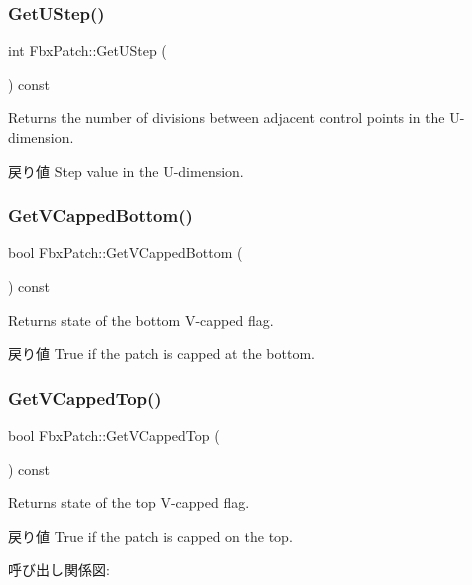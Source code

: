 \subsubsection{\texorpdfstring{Get\+U\+Step()}{GetUStep()}}
{\footnotesize\ttfamily int Fbx\+Patch\+::\+Get\+U\+Step (\begin{DoxyParamCaption}{ }\end{DoxyParamCaption}) const}

Returns the number of divisions between adjacent control points in the U-\/dimension. \begin{DoxyReturn}{戻り値}
Step value in the U-\/dimension. 
\end{DoxyReturn}
\mbox{\label{class_fbx_patch_a57ded499bc9f25f46dd2b3acd44a23f7}} 
\subsubsection{\texorpdfstring{Get\+V\+Capped\+Bottom()}{GetVCappedBottom()}}
{\footnotesize\ttfamily bool Fbx\+Patch\+::\+Get\+V\+Capped\+Bottom (\begin{DoxyParamCaption}{ }\end{DoxyParamCaption}) const}

Returns state of the bottom V-\/capped flag. \begin{DoxyReturn}{戻り値}
{\ttfamily True} if the patch is capped at the bottom. 
\end{DoxyReturn}
\mbox{\label{class_fbx_patch_a55ab377367fd1592ef5111a85e0f7a48}} 
\subsubsection{\texorpdfstring{Get\+V\+Capped\+Top()}{GetVCappedTop()}}
{\footnotesize\ttfamily bool Fbx\+Patch\+::\+Get\+V\+Capped\+Top (\begin{DoxyParamCaption}{ }\end{DoxyParamCaption}) const}

Returns state of the top V-\/capped flag. \begin{DoxyReturn}{戻り値}
{\ttfamily True} if the patch is capped on the top. 
\end{DoxyReturn}
呼び出し関係図\+:
\mbox{\label{class_fbx_patch_aea85ef627c9d56153e85ad0007101f72}} 

